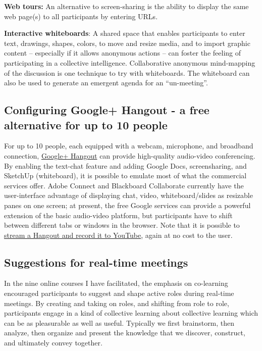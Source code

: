 \textbf{Web tours:} An alternative to screen-sharing is the ability to
display the same web page(s) to all participants by entering URLs.

\textbf{Interactive whiteboards}: A shared space that enables
participants to enter text, drawings, shapes, colors, to move and resize
media, and to import graphic content -- especially if it allows
anonymous actions -- can foster the feeling of participating in a
collective intelligence. Collaborative anonymous mind-mapping of the
discussion is one technique to try with whiteboards. The whiteboard can
also be used to generate an emergent agenda for an ``un-meeting''.

\subsection{Configuring Google+ Hangout - a free alternative for up to
10 people}

For up to 10 people, each equipped with a webcam, microphone, and
broadband connection,
\href{http://lifehacker.com/5842191/google\%252B-hangouts-adds-screen-sharing-google-docs-collaboration-and-more}{Google+
Hangout} can provide high-quality audio-video conferencing. By enabling
the text-chat feature and adding Google Docs, screensharing, and
SketchUp (whiteboard), it is possible to emulate most of what the
commercial services offer. Adobe Connect and Blackboard Collaborate
currently have the user-interface advantage of displaying chat, video,
whiteboard/slides as resizable panes on one screen; at present, the free
Google services can provide a powerful extension of the basic
audio-video platform, but participants have to shift between different
tabs or windows in the browser. Note that it is possible to
\href{http://www.google.com/+/learnmore/hangouts/onair.html}{stream a
Hangout and record it to YouTube}, again at no cost to the user.

\subsection{Suggestions for real-time meetings}

In the nine online courses I have facilitated, the emphasis on
co-learning encouraged participants to suggest and shape active roles
during real-time meetings. By creating and taking on roles, and shifting
from role to role, participants engage in a kind of collective learning
about collective learning which can be as pleasurable as well as useful.
Typically we first brainstorm, then analyze, then organize and present
the knowledge that we discover, construct, and ultimately convey
together.

